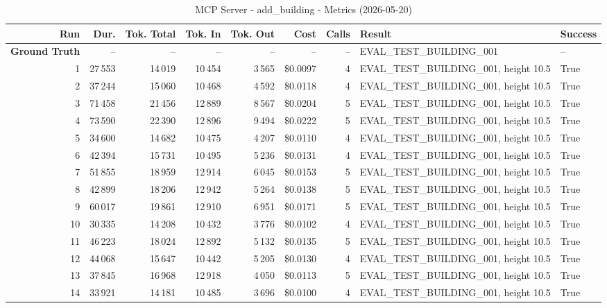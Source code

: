 \documentclass[a4paper,11pt]{article}
\begin{document}
\begin{table}[ht]
\centering
\scriptsize
\caption{MCP Server - add\_building - Metrics (2026-05-20)}
\label{tab:mcp\_add\_building\_metrics\_2026-05-20}
\begin{tabular}{r r r r r r r p{3cm} l}
\hline
Run & Dur. & Tok. Total & Tok. In & Tok. Out & Cost & Calls & Result & Success \\
\hline
\textbf{Ground Truth} & -- & -- & -- & -- & -- & -- & EVAL\_TEST\_BUILDING\_001 & -- \\
\hline
1 & 27\,553 & 14\,019 & 10\,454 & 3\,565 & \$0.0097 & 4 & EVAL\_TEST\_BUILDING\_001, height 10.5 & True \\
2 & 37\,244 & 15\,060 & 10\,468 & 4\,592 & \$0.0118 & 4 & EVAL\_TEST\_BUILDING\_001, height 10.5 & True \\
3 & 71\,458 & 21\,456 & 12\,889 & 8\,567 & \$0.0204 & 5 & EVAL\_TEST\_BUILDING\_001, height 10.5 & True \\
4 & 73\,590 & 22\,390 & 12\,896 & 9\,494 & \$0.0222 & 5 & EVAL\_TEST\_BUILDING\_001, height 10.5 & True \\
5 & 34\,600 & 14\,682 & 10\,475 & 4\,207 & \$0.0110 & 4 & EVAL\_TEST\_BUILDING\_001, height 10.5 & True \\
6 & 42\,394 & 15\,731 & 10\,495 & 5\,236 & \$0.0131 & 4 & EVAL\_TEST\_BUILDING\_001, height 10.5 & True \\
7 & 51\,855 & 18\,959 & 12\,914 & 6\,045 & \$0.0153 & 5 & EVAL\_TEST\_BUILDING\_001, height 10.5 & True \\
8 & 42\,899 & 18\,206 & 12\,942 & 5\,264 & \$0.0138 & 5 & EVAL\_TEST\_BUILDING\_001, height 10.5 & True \\
9 & 60\,017 & 19\,861 & 12\,910 & 6\,951 & \$0.0171 & 5 & EVAL\_TEST\_BUILDING\_001, height 10.5 & True \\
10 & 30\,335 & 14\,208 & 10\,432 & 3\,776 & \$0.0102 & 4 & EVAL\_TEST\_BUILDING\_001, height 10.5 & True \\
11 & 46\,223 & 18\,024 & 12\,892 & 5\,132 & \$0.0135 & 5 & EVAL\_TEST\_BUILDING\_001, height 10.5 & True \\
12 & 44\,068 & 15\,647 & 10\,442 & 5\,205 & \$0.0130 & 4 & EVAL\_TEST\_BUILDING\_001, height 10.5 & True \\
13 & 37\,845 & 16\,968 & 12\,918 & 4\,050 & \$0.0113 & 5 & EVAL\_TEST\_BUILDING\_001, height 10.5 & True \\
14 & 33\,921 & 14\,181 & 10\,485 & 3\,696 & \$0.0100 & 4 & EVAL\_TEST\_BUILDING\_001, height 10.5 & True \\

\end{tabular}
\end{table}
\end{document}
